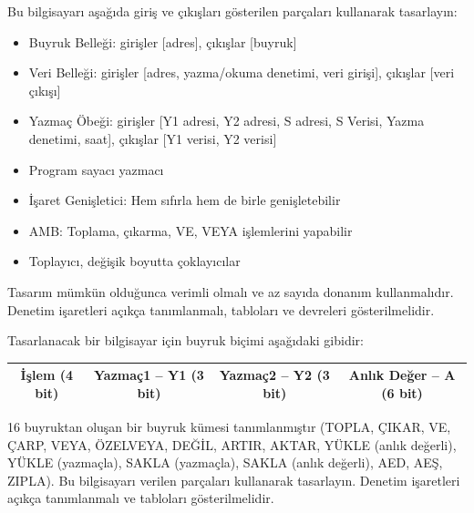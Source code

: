 \begin{alistirma}[\zor]
Bu bilgisayarı aşağıda giriş ve çıkışları gösterilen parçaları kullanarak tasarlayın:
\begin{itemize}
    \item Buyruk Belleği: girişler [adres], çıkışlar [buyruk]
    \item Veri Belleği: girişler [adres, yazma/okuma denetimi, veri girişi], çıkışlar [veri çıkışı]
    \item Yazmaç Öbeği: girişler [Y1 adresi, Y2 adresi, S adresi, S Verisi, Yazma denetimi, saat], çıkışlar [Y1 verisi, Y2 verisi]
    \item Program sayacı yazmacı
    \item İşaret Genişletici: Hem sıfırla hem de birle genişletebilir
    \item AMB: Toplama, çıkarma, VE, VEYA işlemlerini yapabilir
    \item Toplayıcı, değişik boyutta çoklayıcılar
\end{itemize}
Tasarım mümkün olduğunca verimli olmalı ve az sayıda donanım kullanmalıdır. Denetim işaretleri açıkça tanımlanmalı, tabloları ve devreleri gösterilmelidir.
\end{alistirma}

\begin{alistirma}[\zor]
Tasarlanacak bir bilgisayar için buyruk biçimi aşağıdaki gibidir:

\begin{center}
\begin{tabular}{|c|c|c|c|}
\hline
İşlem (4 bit) & Yazmaç1 -- Y1 (3 bit) & Yazmaç2 -- Y2 (3 bit) & Anlık Değer -- A (6 bit) \\
\hline
\end{tabular}
\end{center}

16 buyruktan oluşan bir buyruk kümesi tanımlanmıştır (TOPLA, ÇIKAR, VE, ÇARP, VEYA, ÖZELVEYA, DEĞİL, ARTIR, AKTAR, YÜKLE (anlık değerli), YÜKLE (yazmaçla), SAKLA (yazmaçla), SAKLA (anlık değerli), AED, AEŞ, ZIPLA). Bu bilgisayarı verilen parçaları kullanarak tasarlayın. Denetim işaretleri açıkça tanımlanmalı ve tabloları gösterilmelidir.
\end{alistirma}

